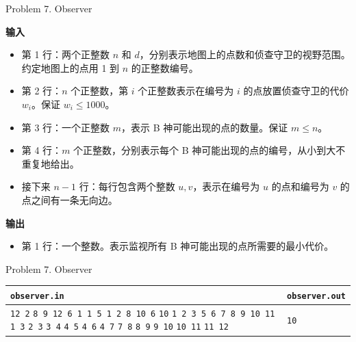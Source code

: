 \documentclass[UTF8]{beamer}
\begin{document}
\begin{frame}{Problem 7. Observer}

\textbf{输入}
\begin{itemize}
    \item 第 1 行：两个正整数 $n$ 和 $d$，分别表示地图上的点数和侦查守卫的视野范围。
                    约定地图上的点用 1 到 $n$ 的正整数编号。
    \item 第 2 行：$n$ 个正整数，第 $i$ 个正整数表示在编号为 $i$ 的点放置侦查守卫的代价 $w_i$。保证 $w_i \leq 1000$。
    \item 第 3 行：一个正整数 $m$，表示 B 神可能出现的点的数量。保证 $m \leq n$。
    \item 第 4 行：$m$ 个正整数，分别表示每个 B 神可能出现的点的编号，从小到大不重复地给出。
    \item 接下来 $n - 1$ 行：每行包含两个整数 $u, v$，表示在编号为 $u$ 的点和编号为 $v$ 的点之间有一条无向边。
\end{itemize}
\textbf{输出}
\begin{itemize}
    \item 第 1 行：一个整数。表示监视所有 B 神可能出现的点所需要的最小代价。
\end{itemize}

\end{frame}

\begin{frame}{Problem 7. Observer}
\small{
\begin{tabularx}{\textwidth}{|X|X|}
\hline
\texttt{\textbf{observer.in}} & \texttt{\textbf{observer.out}} \\ \hline
\texttt{12 2}\newline
\texttt{8 9 12 6 1 1 5 1 2 8 10 6}\newline
\texttt{10}\newline
\texttt{1 2 3 5 6 7 8 9 10 11}\newline
\texttt{1 3}\newline
\texttt{2 3}\newline
\texttt{3 4}\newline
\texttt{4 5}\newline
\texttt{4 6}\newline
\texttt{4 7}\newline
\texttt{7 8}\newline
\texttt{8 9}\newline
\texttt{9 10}\newline
\texttt{10 11}\newline
\texttt{11 12}
&
\texttt{10}
\\ \hline
\end{tabularx}
}
\newline

\end{frame}
\end{document}
